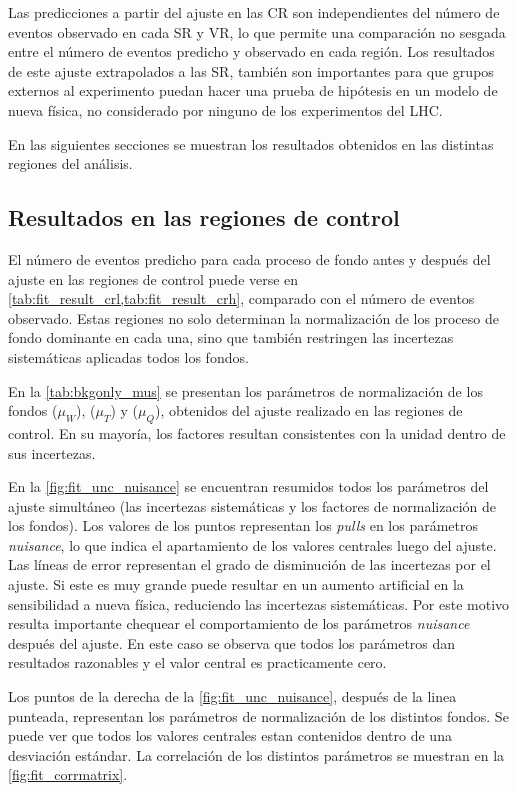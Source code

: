 Las predicciones a partir del ajuste en las CR son independientes del número de
eventos observado en cada SR y VR, lo que permite una comparación no sesgada
entre el número de eventos predicho y observado en cada región. Los resultados
de este ajuste extrapolados a las SR, también son importantes para que grupos
externos al experimento puedan hacer una prueba de hipótesis en un modelo de
nueva física, no considerado por ninguno de los experimentos del LHC.

En las siguientes secciones se muestran los resultados obtenidos
en las distintas regiones del análisis.


\subsection{Resultados en las regiones de control}

El número de eventos predicho para cada proceso de fondo antes y después del ajuste en
las regiones de control puede verse en \cref{tab:fit_result_crl,tab:fit_result_crh},
comparado con el número de eventos observado.
Estas regiones no solo determinan la normalización de los proceso de fondo dominante
en cada una, sino que también restringen las incertezas sistemáticas aplicadas todos
los fondos.

En la \cref{tab:bkgonly_mus} se presentan los parámetros de normalización de
los fondos {\wgam} ($\mu_W$), {\ttgam} ($\mu_T$) y {\gjet}
($\mu_Q$), obtenidos del ajuste realizado en las regiones de control.
En su mayoría, los factores resultan consistentes con la unidad dentro de sus incertezas.

En la \cref{fig:fit_unc_nuisance} se encuentran resumidos todos los parámetros
del ajuste simultáneo (las incertezas sistemáticas y los factores de
normalización de los fondos). Los valores de los puntos representan los
\emph{pulls} en los parámetros \emph{nuisance}, lo que indica el apartamiento de los valores
centrales luego del ajuste. Las líneas de error representan el
 grado de disminución de las incertezas por el
ajuste. Si este es muy grande puede resultar en un aumento artificial
en la sensibilidad a nueva física, reduciendo las incertezas sistemáticas.
Por este motivo resulta importante
chequear el comportamiento de los parámetros \emph{nuisance} después del ajuste.
En este caso se observa que todos los parámetros dan resultados razonables
y el valor central es practicamente cero.

Los puntos de la derecha de la \cref{fig:fit_unc_nuisance}, después de la linea
punteada, representan los parámetros de normalización de los distintos fondos. Se
puede ver que todos los valores centrales estan contenidos dentro de una desviación estándar.
La correlación de los distintos parámetros se muestran en la \cref{fig:fit_corrmatrix}.

